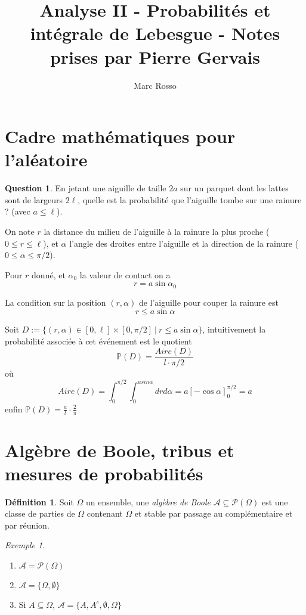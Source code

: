 \documentclass[]{article}
\title{Analyse II - Probabilités et intégrale de Lebesgue - Notes prises par Pierre Gervais}
\author{Marc Rosso}
\theoremstyle{remark}
\newtheorem{myexmpl}{Exemple}
\theoremstyle{definition}
\newtheorem{mydef}{Définition}
\newtheorem{myquestion}{Question}
\begin{document}
\maketitle

\tableofcontents

\newpage

\section{Cadre mathématiques pour l'aléatoire}

\begin{myquestion}
	En jetant une aiguille de taille $2a$ sur un parquet dont les lattes sont de largeurs $2 \ell$, quelle est la probabilité que l'aiguille tombe sur une rainure ? (avec $a \leqslant \ell$).
	
	On note $r$ la distance du milieu de l'aiguille à la rainure la plus proche ($0 \leqslant r \leqslant \ell$), et $\alpha$ l'angle des droites entre l'aiguille et la direction de la rainure ($0 \leqslant \alpha \leqslant \pi/2$).	
	
	Pour $r$ donné, et $\alpha_0$ la valeur de contact on a $$r = a \sin \alpha_0$$
	
	La condition sur la position $(r, \alpha)$ de l'aiguille pour couper la rainure est $$r \leqslant a \sin \alpha$$
	
	Soit $D := \{(r, \alpha) \in [0, \ell] \times [0, \pi / 2] ~ | ~ r \leqslant a \sin \alpha\}$, intuitivement la probabilité associée à cet événement est le quotient $$\mathbb{P}(D) = \frac{Aire(D)}{l \cdot \pi / 2}$$ où $$Aire(D) = \int_{0}^{\pi/2} \int_{0}^{a sin \alpha}dr d\alpha = a [-\cos \alpha]_0^{\pi/2} = a$$ enfin $\mathbb{P}(D) = \frac{a}{l} \cdot \frac{2}{\pi}$
\end{myquestion}

\section{Algèbre de Boole, tribus et mesures de probabilités}

\begin{mydef}
	Soit $\Omega$ un ensemble, une \textit{algèbre de Boole} $\mathcal{A} \subseteq \mathcal{P}(\Omega)$ est une classe de parties de $\Omega$ contenant $\Omega$ et stable par passage au complémentaire et par réunion.
\end{mydef}

\newpage

\begin{myexmpl}
	\leavevmode
	\begin{enumerate}
		\item $\mathcal{A} = \mathcal{P}(\Omega)$
		\item $\mathcal{A} = \{\Omega, \emptyset\}$
		\item Si $A \subseteq \Omega$, $\mathcal{A} = \{A, A^c, \emptyset, \Omega\}$
	\end{enumerate}
\end{myexmpl}
\end{document}
